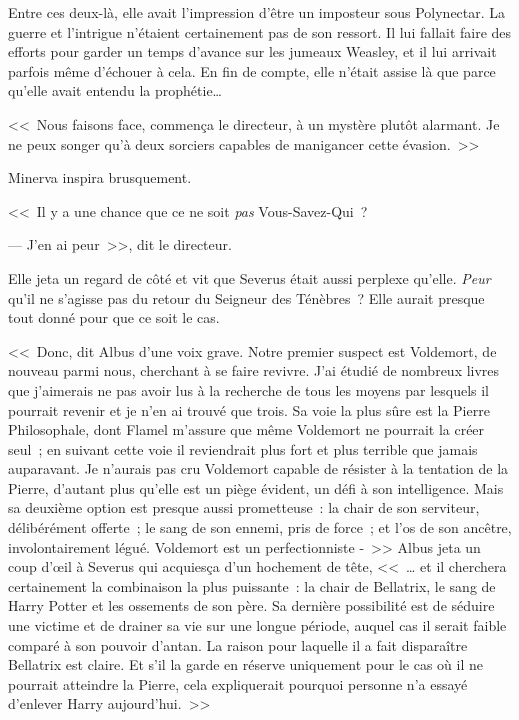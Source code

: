 Entre ces deux-là, elle avait l'impression d'être un imposteur sous Polynectar. La guerre et l'intrigue n'étaient certainement pas de son ressort. Il lui fallait faire des efforts pour garder un temps d'avance sur les jumeaux Weasley, et il lui arrivait parfois même d'échouer à cela. En fin de compte, elle n'était assise là que parce qu'elle avait entendu la prophétie…

<<~Nous faisons face, commença le directeur, à un mystère plutôt alarmant. Je ne peux songer qu'à deux sorciers capables de manigancer cette évasion.~>>

Minerva inspira brusquement.

<<~Il y a une chance que ce ne soit \emph{pas} Vous-Savez-Qui~?

--- J'en ai peur~>>, dit le directeur.

Elle jeta un regard de côté et vit que Severus était aussi perplexe qu'elle. \emph{Peur} qu'il ne s'agisse pas du retour du Seigneur des Ténèbres~? Elle aurait presque tout donné pour que ce soit le cas.

<<~Donc, dit Albus d'une voix grave. Notre premier suspect est Voldemort, de nouveau parmi nous, cherchant à se faire revivre. J'ai étudié de nombreux livres que j'aimerais ne pas avoir lus à la recherche de tous les moyens par lesquels il pourrait revenir et je n'en ai trouvé que trois. Sa voie la plus sûre est la Pierre Philosophale, dont Flamel m'assure que même Voldemort ne pourrait la créer seul~; en suivant cette voie il reviendrait plus fort et plus terrible que jamais auparavant. Je n'aurais pas cru Voldemort capable de résister à la tentation de la Pierre, d'autant plus qu'elle est un piège évident, un défi à son intelligence. Mais sa deuxième option est presque aussi prometteuse~: la chair de son serviteur, délibérément offerte~; le sang de son ennemi, pris de force~; et l'os de son ancêtre, involontairement légué. Voldemort est un perfectionniste -~>> Albus jeta un coup d'œil à Severus qui acquiesça d'un hochement de tête, <<~… et il cherchera certainement la combinaison la plus puissante~: la chair de Bellatrix, le sang de Harry Potter et les ossements de son père. Sa dernière possibilité est de séduire une victime et de drainer sa vie sur une longue période, auquel cas il serait faible comparé à son pouvoir d'antan. La raison pour laquelle il a fait disparaître Bellatrix est claire. Et s'il la garde en réserve uniquement pour le cas où il ne pourrait atteindre la Pierre, cela expliquerait pourquoi personne n'a essayé d'enlever Harry aujourd'hui.~>>

